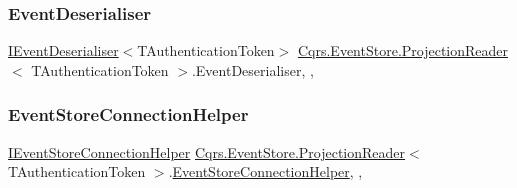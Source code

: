 \subsubsection{\texorpdfstring{Event\+Deserialiser}{EventDeserialiser}}
{\footnotesize\ttfamily \hyperlink{interfaceCqrs_1_1EventStore_1_1IEventDeserialiser}{I\+Event\+Deserialiser}$<$T\+Authentication\+Token$>$ \hyperlink{classCqrs_1_1EventStore_1_1ProjectionReader}{Cqrs.\+Event\+Store.\+Projection\+Reader}$<$ T\+Authentication\+Token $>$.Event\+Deserialiser\hspace{0.3cm}{\ttfamily [get]}, {\ttfamily [set]}, {\ttfamily [protected]}}

\mbox{\label{classCqrs_1_1EventStore_1_1ProjectionReader_ab169b1404cc40751c3a71c772ed0eaa4_ab169b1404cc40751c3a71c772ed0eaa4}} 
\subsubsection{\texorpdfstring{Event\+Store\+Connection\+Helper}{EventStoreConnectionHelper}}
{\footnotesize\ttfamily \hyperlink{interfaceCqrs_1_1EventStore_1_1IEventStoreConnectionHelper}{I\+Event\+Store\+Connection\+Helper} \hyperlink{classCqrs_1_1EventStore_1_1ProjectionReader}{Cqrs.\+Event\+Store.\+Projection\+Reader}$<$ T\+Authentication\+Token $>$.\hyperlink{classCqrs_1_1EventStore_1_1EventStoreConnectionHelper}{Event\+Store\+Connection\+Helper}\hspace{0.3cm}{\ttfamily [get]}, {\ttfamily [set]}, {\ttfamily [protected]}}

